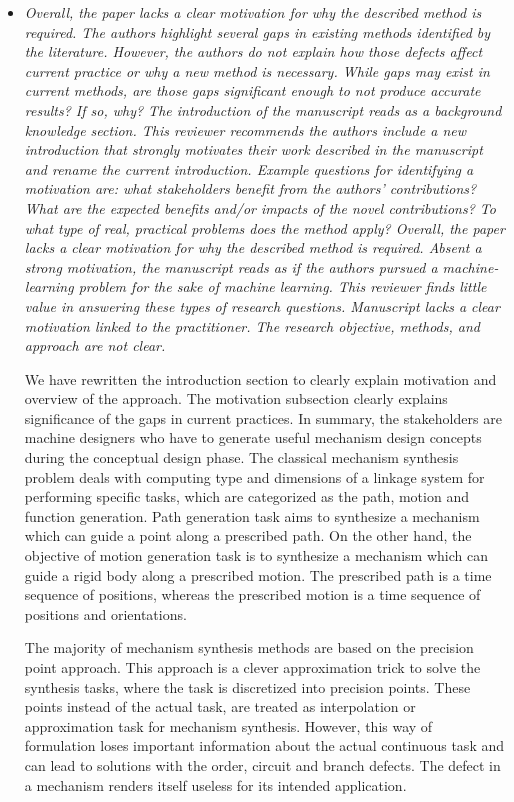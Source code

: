 \documentclass{article}
\begin{document}
\begin{itemize}
  \item \emph{
Overall, the paper lacks a clear motivation for why the described method is required.
The authors highlight several gaps in existing methods identified by the literature.
However, the authors do not explain how those defects affect current practice or why a new method is necessary.
While gaps may exist in current methods, are those gaps significant enough to not produce accurate results? If so, why? The introduction of the manuscript reads as a background knowledge section.
This reviewer recommends the authors include a new introduction that strongly motivates their work described in the manuscript and rename the current introduction.
Example questions for identifying a motivation are: what stakeholders benefit from the authors' contributions? What are the expected benefits and/or impacts of the novel contributions? To what type of real, practical problems does the method apply?
Overall, the paper lacks a clear motivation for why the described method is required.
Absent a strong motivation, the manuscript reads as if the authors pursued a machine-learning problem for the sake of machine learning. This reviewer finds little value in answering these types of research questions.
Manuscript lacks a clear motivation linked to the practitioner.
The research objective, methods, and approach are not clear.
}

We have rewritten the introduction section to clearly explain motivation and overview of the approach. The motivation subsection clearly explains significance of the gaps in current practices. In summary, the stakeholders are machine designers who have to generate useful mechanism design concepts during the conceptual design phase. The classical mechanism synthesis problem deals with computing type and dimensions of a linkage system for performing specific tasks, which are categorized as the path, motion and function generation.
Path generation task aims to synthesize a mechanism which can guide a point along a prescribed path. On the other hand, the objective of motion generation task is to synthesize a mechanism which can guide a rigid body along a prescribed motion. The prescribed path is a time sequence of positions, whereas the prescribed motion is a time sequence of positions and orientations.

The majority of mechanism synthesis methods are based on the precision point approach. This approach is a clever approximation trick to solve the synthesis tasks, where the task is discretized into precision points.
These points instead of the actual task, are treated as interpolation or approximation task for mechanism synthesis. However, this way of formulation loses important information about the actual continuous task and can lead to solutions with the order, circuit and branch defects.
The defect in a mechanism renders itself useless for its intended application.


\end{itemize}
\end{document}
